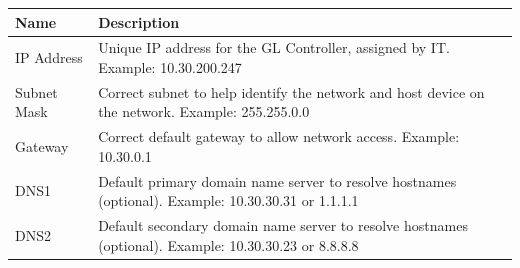\begin{longtable}[]{@{}ll@{}}
\toprule
\begin{minipage}[b]{0.22\columnwidth}\raggedright
Name\strut
\end{minipage} & \begin{minipage}[b]{0.72\columnwidth}\raggedright
Description\strut
\end{minipage}\tabularnewline
\midrule
\endhead
\begin{minipage}[t]{0.22\columnwidth}\raggedright
IP Address\strut
\end{minipage} & \begin{minipage}[t]{0.72\columnwidth}\raggedright
Unique IP address for the GL Controller, assigned by IT. Example:
10.30.200.247\strut
\end{minipage}\tabularnewline
\begin{minipage}[t]{0.22\columnwidth}\raggedright
Subnet Mask\strut
\end{minipage} & \begin{minipage}[t]{0.72\columnwidth}\raggedright
Correct subnet to help identify the network and host device on the
network. Example: 255.255.0.0\strut
\end{minipage}\tabularnewline
\begin{minipage}[t]{0.22\columnwidth}\raggedright
Gateway\strut
\end{minipage} & \begin{minipage}[t]{0.72\columnwidth}\raggedright
Correct default gateway to allow network access. Example:
10.30.0.1\strut
\end{minipage}\tabularnewline
\begin{minipage}[t]{0.22\columnwidth}\raggedright
DNS1\strut
\end{minipage} & \begin{minipage}[t]{0.72\columnwidth}\raggedright
Default primary domain name server to resolve hostnames (optional).
Example: 10.30.30.31 or 1.1.1.1\strut
\end{minipage}\tabularnewline
\begin{minipage}[t]{0.22\columnwidth}\raggedright
DNS2\strut
\end{minipage} & \begin{minipage}[t]{0.72\columnwidth}\raggedright
Default secondary domain name server to resolve hostnames (optional).
Example: 10.30.30.23 or 8.8.8.8\strut
\end{minipage}\tabularnewline
\bottomrule
\end{longtable}

